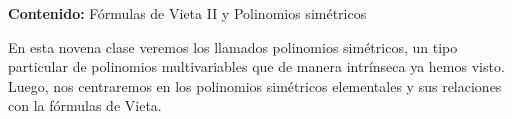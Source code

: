 {\Large
    \textbf{Contenido:} Fórmulas de Vieta II y Polinomios simétricos
}

En esta novena clase veremos los llamados polinomios simétricos, un tipo particular de polinomios multivariables que de manera intrínseca ya hemos visto.
Luego, nos centraremos en los polinomios simétricos elementales y sus relaciones con la fórmulas de Vieta.
